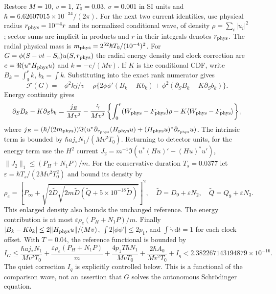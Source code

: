 \documentclass[11pt]{article}
\theoremstyle{definition}\newtheorem{definition}[theorem]{Definition}
\theoremstyle{remark}\newtheorem{remark}[theorem]{Remark}
\newcommand{\dd}{\,\mathrm d}\newcommand{\Imv}{\operatorname{Im}}\newcommand{\ii}{\mathrm i}
\begin{document}
Restore $M=10$, $v=1$, $T_0=0.03$, $\sigma=0.001$ in SI units and
$\hbar=6.62607015\times10^{-34}/(2\pi)$.
For the next two current identities, use physical radius $r_{\rm phys}=10^{-4}r$
and its normalized conditional wave, of density $\rho=\sum_i|u_i|^2$;
sector sums are implicit in products and $r$ in their integrals denotes
$r_{\rm phys}$. The radial physical mass is
$m_{\rm phys}=2^{52}\hbar T_0/(10^{-4})^2$.
For $G=\phi(S-vt-S_c)u(S,r_{\rm phys})$ the radial energy density and clock correction
are $e=\Re(u^*H_{\rm phys}u)$ and $k=-e/(Mv)$.
If $K$ is the conditional CDF, write $B_k=\int_0^r k$, $b_k=\int k$.
Substituting into the exact rank numerator gives
\[
 \mathcal F(G)=-\phi^2kj/v-
 \rho\{2\phi\phi'(B_k-Kb_k)+\phi^2(\partial_SB_k-K\partial_Sb_k)\}.
\]
Energy continuity gives
\[
 \partial_SB_k-K\partial_Sb_k=\frac{j_E}{Mv^2}
 -\frac{\dot\gamma}{Mv^2}
       \left\{\int_0^r(W_{\rm phys}-F_{\rm phys})\rho
                        -K\langle W_{\rm phys}-F_{\rm phys}\rangle\right\},
\]
where $j_E=(\hbar/(2m_{\rm phys}))\Im(u^*\partial_{r_{\rm phys}}(H_{\rm phys}u)
 +(H_{\rm phys}u)^*\partial_{r_{\rm phys}}u)$.
The intrinsic term is bounded by
$\hbar a j_*N_1/(Mv^2T_0)$.
Returning to detector units, for the energy term use the $H^2$ current
$J_2=m^{-1}\Im(u^*(Hu)'+(Hu)^*u')$,
$\|J_2\|_1\leq(P_H+N_1P)/m$.
For the conservative duration $T_s=0.0377$ let
$\varepsilon=\hbar T_s/(2Mv^2T_0^2)$ and bound its density by
\[
 \rho_e=\left[P_\infty+
 \sqrt{2\widetilde D\sqrt{2m\widetilde D
                 (\widetilde Q+5\times10^{-18}\widetilde D)}}\right]^2,
 \quad \widetilde D=D_9+\varepsilon N_2,\quad
 \widetilde Q=Q_9+\varepsilon N_3.
\]
This enlarged density also bounds the unchanged reference.
The energy contribution is at most
$\varepsilon\rho_e(P_H+N_1P)/m$.
Finally $|B_k-Kb_k|\leq2\|H_{\rm phys}u\|/(Mv)$,
$\int2|\phi\phi'|\leq2p_1$, and $\int\dot\gamma\dd t=1$
for each clock offset. With $T=0.04$, the reference functional is bounded by
\begin{equation}
 I_G\leq\frac{\hbar a j_*N_1}{Mv^2T_0}
 +\frac{\varepsilon\rho_e(P_H+N_1P)}m
 +\frac{4p_1T\hbar N_1}{MvT_0}
 +\frac{2\hbar A_0}{Mv^2T_0}+I_q
 <2.382267143194879\times10^{-16}.
 \label{old:referencecurrent}
\end{equation}
The quiet correction $I_q$ is explicitly controlled below.
This is a functional of the comparison wave, not an assertion that
$G$ solves the autonomous Schr\"odinger equation.
\end{document}
